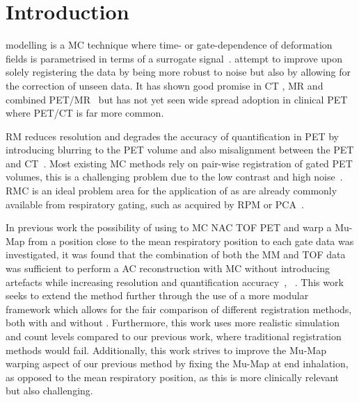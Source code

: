 \section{Introduction} \label{sec:introduction}
     modelling is a \gls{MC} technique where time- or gate-dependence of deformation fields is parametrised in terms of a surrogate signal~\cite{McClelland2013}.   attempt to improve upon solely registering the data by being more robust to noise but also by allowing for the correction of unseen data. It  has shown good promise in \gls{CT}%
    , \gls{MR} %
    and  combined \gls{PET}/\gls{MR}~\cite{Manber2016JointCorrection.} but has not yet seen wide spread adoption in clinical \gls{PET} where \gls{PET}/\gls{CT} is far more common.
    
    \gls{RM} reduces resolution and degrades the accuracy of quantification in \gls{PET} by introducing blurring to the \gls{PET} volume and also misalignment between the \gls{PET} and \gls{CT}~\cite{Nehmeh2008a}. Most existing \gls{MC} methods rely on pair-wise registration of gated \gls{PET} volumes, this is a challenging problem due to the low contrast and high noise~\cite{Oliveira2014}. \gls{RMC} is an ideal problem area for the application of  as  are already commonly available from respiratory gating, such as acquired by \gls{RPM} or \gls{PCA}~\cite{Thielemans2011}.
    
    In previous work the possibility of using  to \gls{MC} \gls{NAC} \gls{TOF} \gls{PET} and warp a \gls{Mu-Map} from a position close to the mean respiratory position to each gate data was investigated, it was found that the combination of both the \gls{MM} and \gls{TOF} data was sufficient to perform a \gls{AC} reconstruction with \gls{MC} without introducing artefacts while increasing resolution and quantification accuracy~\cite{Whitehead2019ImpactPET}, ~\cite{Whitehead2020PET/CTFields}. This work seeks to extend the method further through the use of a more modular framework which allows for the fair comparison of different registration methods, both with and without . Furthermore, this work uses more realistic simulation and count levels compared to our previous work, where traditional registration methods would fail. Additionally, this work strives to improve the \gls{Mu-Map} warping aspect of our previous method by fixing the \gls{Mu-Map} at end inhalation, as opposed to the mean respiratory position, as this is more clinically relevant but also challenging.

